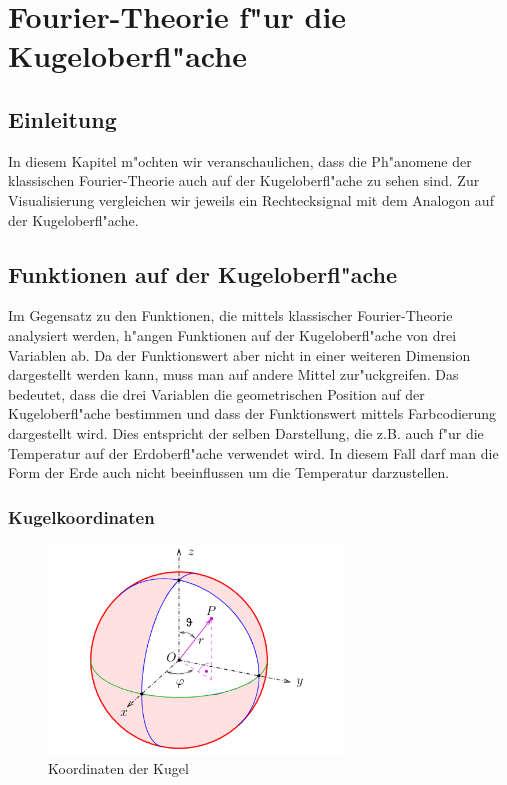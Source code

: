\chapter{Fourier-Theorie f"ur die Kugeloberfl"ache
\label{chapter:kugel}}
\begin{refsection}

\section{Einleitung}
In diesem Kapitel m"ochten wir veranschaulichen, dass die Ph"anomene 
der klassischen Fourier-Theorie auch auf der Kugeloberfl"ache zu 
sehen sind.
Zur Visualisierung vergleichen wir jeweils ein Rechtecksignal mit 
dem Analogon auf der Kugeloberfl"ache.

\section{Funktionen auf der Kugeloberfl"ache}
Im Gegensatz zu den Funktionen, die mittels klassischer 
Fourier-Theorie analysiert werden, h"angen Funktionen auf der 
Kugeloberfl"ache von drei Variablen ab. 
Da der Funktionswert aber nicht in einer weiteren Dimension 
dargestellt werden kann, muss man auf andere Mittel zur"uckgreifen. 
Das bedeutet, dass die drei Variablen die geometrischen Position
auf der Kugeloberfl"ache bestimmen und dass der Funktionswert 
mittels Farbcodierung dargestellt wird. 
Dies entspricht der selben Darstellung, die z.B. auch f"ur die 
Temperatur auf der Erdoberfl"ache verwendet wird. In diesem Fall 
darf man die Form der Erde auch nicht beeinflussen um die Temperatur 
darzustellen.
\subsection{Kugelkoordinaten}
\begin{figure}%
\centering
\includegraphics[width=0.7\textwidth]{kugel/Kugelkoord.pdf}
\caption{Koordinaten der Kugel
\label{skript:Koordinaten der Kugel}}
\end{figure}


\end{refsection}
